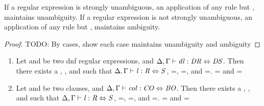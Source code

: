 \begin{lemma}
If a regular expression is strongly unambiguous, an application of any rule but
\StarstarRule{}, maintains unambiguity.
If a regular expression is not strongly unambiguous, an application of any rule
but \StarstarRule{}, maintains ambiguity.
\end{lemma}
\begin{proof}
TODO: By cases, show each case maintains unambiguity and ambiguity
\end{proof}

\begin{lemma}\leavevmode
\label{lem:dnfcal}
\begin{enumerate}
\item Let \DNFRegex{} and \DNFRegexAlt{} be two dnf regular expressions, and $\Delta, \Gamma \vdash \mathit{dl} : \mathit{DR} \Leftrightarrow \mathit{DS}$.  Then there exists a \Lens{}, \Regex{}, and \RegexAlt{} such that $\Delta, \Gamma \vdash \mathit{l} : \mathit{R} \Leftrightarrow \mathit{S}$, \PutRightOf{\Lens}=\PutRightOf{\DNFLens}, \LanguageOf{\Regex}=\LanguageOf{\DNFRegex}, and \LanguageOf{\RegexAlt}=\LanguageOf{\DNFRegexAlt}.  \LanguageOf{\Regex{}} = \LanguageOf{\DNFRegex{}} and
\LanguageOf{\RegexAlt{}} = \LanguageOf{\DNFRegexAlt{}}

\item Let \Conjunct{} and \ConjunctAlt{} be two clauses, and $\Delta, \Gamma \vdash \mathit{col} : \mathit{CO} \Leftrightarrow \mathit{BO}$.  Then there exists a \Lens{}, \Regex{}, and \RegexAlt{} such that $\Delta, \Gamma \vdash \mathit{l} : \mathit{R} \Leftrightarrow \mathit{S}$, \PutRightOf{\Lens}=\PutRightOf{\ConjunctLens}, \LanguageOf{\Regex}=\LanguageOf{\Conjunct}, and \LanguageOf{\RegexAlt}=\LanguageOf{\ConjunctAlt}.  \LanguageOf{\Regex{}} = \LanguageOf{\Conjunct{}} and
\LanguageOf{\RegexAlt{}} = \LanguageOf{\ConjunctAlt{}}


\end{enumerate}
\end{lemma}
